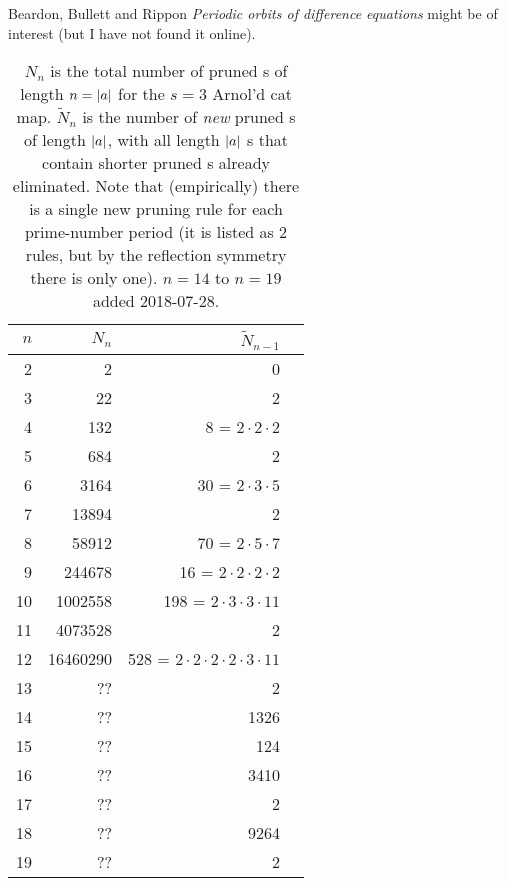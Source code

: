 \begin{description}
{Beardon, Bullett and Rippon
{\em Periodic orbits of difference equations} might be of interest
(but I have not found it online).
    }

\begin{table}
\begin{tabular}{r|r|r|l|}
  $n$ & $N_n$ & $\tilde{N}_{n-1}$ \\
  \hline
  2 & 2 & 0 \\
  3 & 22 & 2 \\
  4 & 132 & 8 = $2 \cdot 2 \cdot 2$\\
  5 & 684 & 2 \\
  6 & 3164 & 30 = $2 \cdot 3 \cdot 5$\\
  7 & 13894 & 2 \\
  8 & 58912 & 70  = $2 \cdot 5 \cdot 7$\\
  9 & 244678 & 16  = $2 \cdot 2 \cdot 2 \cdot 2$\\
  10 & 1002558 & 198 = $2 \cdot 3 \cdot 3 \cdot 11$ \\
  11 & 4073528 & 2 \\
  12 & 16460290 & 528 = $2 \cdot 2 \cdot 2 \cdot 2 \cdot 3 \cdot 11$\\
  13 & ?? & 2 \\
  14 & ?? & 1326 \\
  15 & ?? & 124 \\
  16 & ?? & 3410 \\
  17 & ?? & 2 \\
  18 & ?? & 9264 \\
  19 & ?? & 2 \\
\end{tabular}
\caption{\label{tab:LHarnoldPruned}
$N_n$ is the total number of pruned {\brick s} of length  $n={|a|}$ for the
$s=3$ Arnol'd cat map. $\tilde{N}_n$ is the number of \emph{new} pruned
{\brick s} of length  ${|a|}$, with all length  ${|a|}$ {\brick s} that contain
shorter pruned {\brick s} already eliminated. Note that (empirically) there is
a single new pruning rule for each prime-number period (it is listed as 2
rules, but by the reflection symmetry there is only one). $n=14$ to
$n=19$ added 2018-07-28.
}
\end{table}

\end{description}
